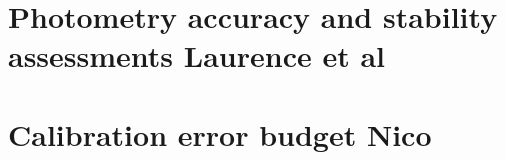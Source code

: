 \documentclass[a4paper, 11pt]{report}
\begin{document}



  

\label{se:aperture_photo_calibration}

\clearpage
\chapter{Photometry accuracy and stability assessments {\color{blue} Laurence et al}}
\label{se:photometry}





%


%







\clearpage
\chapter{Calibration error budget {\color{blue} Nico}}
\label{se:error}



\clearpage
\end{document}
